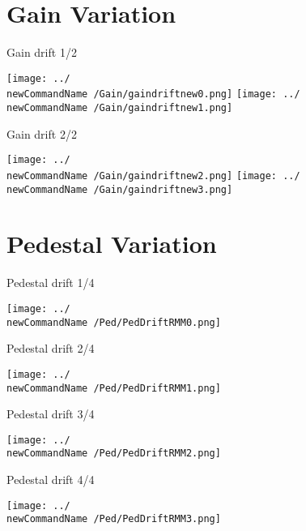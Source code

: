 \documentclass{beamer}
\newcommand{\newCommandName}{0522-0528}
\begin{document}
\section{Gain Variation}
\begin{frame}{Gain drift 1/2}
  \begin{center}
    \texttt{[image: ../\\newCommandName /Gain/gaindriftnew0.png]}
    \hspace{0.5cm}
    \texttt{[image: ../\\newCommandName /Gain/gaindriftnew1.png]}
  \end{center}
\end{frame}

\begin{frame}{Gain drift 2/2}
  \begin{center}
    \texttt{[image: ../\\newCommandName /Gain/gaindriftnew2.png]}
    \hspace{0.5cm}
    \texttt{[image: ../\\newCommandName /Gain/gaindriftnew3.png]}
  \end{center}
\end{frame}

\section{Pedestal Variation}
\begin{frame}{Pedestal drift 1/4}
  \begin{center}
    \texttt{[image: ../\\newCommandName /Ped/PedDriftRMM0.png]}
  \end{center}
\end{frame}
\begin{frame}{Pedestal drift 2/4}
  \begin{center}
    \texttt{[image: ../\\newCommandName /Ped/PedDriftRMM1.png]}
  \end{center}
\end{frame}
\begin{frame}{Pedestal drift 3/4}
  \begin{center}
    \texttt{[image: ../\\newCommandName /Ped/PedDriftRMM2.png]}
  \end{center}
\end{frame}
\begin{frame}{Pedestal drift 4/4}
  \begin{center}
    \texttt{[image: ../\\newCommandName /Ped/PedDriftRMM3.png]}
  \end{center}
\end{frame}
\end{document}
